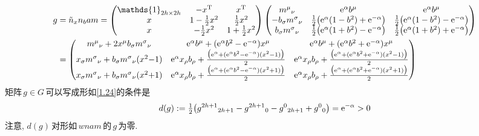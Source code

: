 \begin{align}
    g&=\tilde{n}_{x}n_{b}am =
    \begin{pmatrix}
        \mathds{1}_{2h\times 2h} & -x^{\mathrm{T}} &  x^{\mathrm{T}} \\
        x  & 1-\tfrac{1}{2}x^{2} & \tfrac{1}{2}x^{2} \\
        x & -\tfrac{1}{2}x^{2} & 1+\tfrac{1}{2}x^{2}
    \end{pmatrix}
    \begin{pmatrix}
        m^{\mu}{}_{\nu} & \me^{\alpha}b^{\mu} & \me^{\alpha}b^{\mu} \\
        -b_{\sigma}m^{\sigma}{}_{\nu} & \frac{1}{2}\bigl(\me^{\alpha}(1-b^{2})+\me^{-\alpha}\bigr)&
        \frac{1}{2}\bigl(\me^{\alpha}(1-b^{2})-\me^{-\alpha}\bigr) \\
        b_{\sigma}m^{\sigma}{}_{\nu} &\frac{1}{2}\bigl(\me^{\alpha}(1+b^{2})-\me^{-\alpha}\bigr)&
        \frac{1}{2}\bigl(\me^{\alpha}(1+b^{2})+\me^{-\alpha}\bigr)
    \end{pmatrix} \nonumber \vspace{10pt} \\ 
    &= \begin{pmatrix}
        m^{\mu}{}_{\nu}+2x^{\mu}b_{\sigma}m^{\sigma}{}_{\nu} & \me^{\alpha} b^{\mu}+ (\me^{\alpha}b^{2}-\me^{-\alpha})x^{\mu} &
        \me^{\alpha}b^{\mu}+ (\me^{\alpha}b^{2}+\me^{-\alpha})x^{\mu}  \\
        x_{\sigma}m^{\sigma}{}_{\nu}+b_{\sigma}m^{\sigma}{}_{\nu}(x^{2}{-}1) &
        \me^{\alpha} x_{\rho}b_{\rho} +\frac{\bigl( \me^{\alpha}+(\me^{\alpha}b^{2}-\me^{-\alpha})(x^{2}-1)\bigr)}{2} &
        \me^{\alpha} x_{\rho}b_{\rho} +\frac{\bigl( \me^{\alpha}+(\me^{\alpha}b^{2}+\me^{-\alpha})(x^{2}-1)\bigr)}{2} \\
        x_{\sigma}m^{\sigma}{}_{\nu}+b_{\sigma}m^{\sigma}{}_{\nu}(x^{2}{+}1) &
        \me^{\alpha} x_{\rho}b_{\rho} +\frac{\bigl( \me^{\alpha}+(\me^{\alpha}b^{2}-\me^{-\alpha})(x^{2}+1)\bigr)}{2} &
        \me^{\alpha} x_{\rho}b_{\rho} +\frac{\bigl( \me^{\alpha}+(\me^{\alpha}b^{2}+\me^{-\alpha})(x^{2}+1)\bigr)}{2}
    \end{pmatrix} \label{1.24}
\end{align}
矩阵$\,g\in G\,$可以写成形如\eqref{1.24}的条件是
\begin{equation}
    d(g):=\tfrac{1}{2}\bigl(g^{2h+1}{}_{2h+1}-g^{2h+1}{}_{0}-g^{0}{}_{2h+1}+g^{0}{}_{0}\bigr) =\mathrm{e}^{-\alpha} >0
\end{equation}
注意, $d(g)\,$对形如$\,wnam\,$的$\,g\,$为零.

